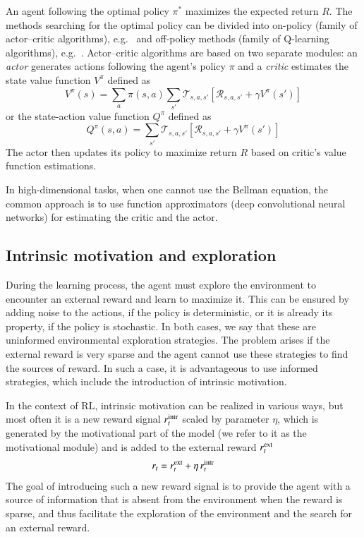 \documentclass[a4paper,11pt]{elsarticle}
\begin{document}
An agent following the optimal policy $\pi^{*}$ maximizes the expected return $R$. The methods searching for the optimal policy can be divided into on-policy (family of actor--critic algorithms), e.g.~\cite{schulman2017proximal}
and off-policy methods (family of Q-learning algorithms), e.g.~\cite{mnih2013playing}.
Actor--critic algorithms are based on two separate modules: an \textit{actor} generates actions following the agent's policy $\pi$ and a \textit{critic} estimates the state value function $V^{\pi}$ defined as
$$
V^{\pi}(s) = \sum_a \pi(s,a) \sum_{s'} \mathcal{T}_{s,a,s'} \left[ \mathcal{R}_{s,a,s'} + \gamma V^{\pi}(s') \right]
$$
or the state-action value function $Q^{\pi}$ defined as
$$
Q^{\pi}(s,a) = \sum_{s'} \mathcal{T}_{s,a,s'} \left[ \mathcal{R}_{s,a,s'} + \gamma V^{\pi}(s') \right]
$$
The actor then updates its policy to maximize return $R$ based on critic's value function estimations.

In high-dimensional tasks, when one cannot use the Bellman equation, the common approach is to use function approximators (deep convolutional neural networks) for estimating the critic and the actor.

\subsection{Intrinsic motivation and exploration}

During the learning process, the agent must explore the environment to encounter an external reward and learn to maximize it. This can be ensured by adding noise to the actions, if the policy is deterministic, or it is already its property, if the policy is stochastic. In both cases, we say that these are uninformed environmental exploration strategies. The problem arises if the external reward is very sparse and the agent cannot use these strategies to find the sources of reward. In such a case, it is advantageous to use informed strategies, which include the introduction of intrinsic motivation.

In the context of RL, intrinsic motivation can be realized in various ways, but most often it is a new reward signal $r^{\rm intr}_t$ scaled by parameter $\eta$, which is generated by the motivational part of the model (we refer to it as the motivational module) and is added to the external reward $r^{\rm ext}_t$
\begin{equation}
\label{eq:rintr}
  r_t = r_t^{\rm ext} + \eta \, r_t^{\rm intr}
\end{equation}
The goal of introducing such a new reward signal is to provide the agent with a source of information that is absent from the environment when the reward is sparse, and thus facilitate the exploration of the environment and the search for an external reward.
\end{document}
